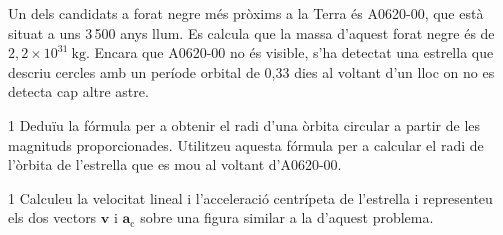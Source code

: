 Un dels candidats a forat negre més pròxims a la Terra és A0620-00, que està situat a uns 3\,500 anys llum. Es calcula que la massa d'aquest forat negre és de $2,2\times 10^{31}\ \mathrm{kg}$. Encara que A0620-00 no és visible, s'ha detectat una estrella que descriu cercles amb un període orbital de 0,33 dies al voltant d'un lloc on no es detecta cap altre astre.


\begin{apartat}{1}
Deduïu la fórmula per a obtenir el radi d'una òrbita circular a partir de les magnituds proporcionades. Utilitzeu aquesta fórmula per a calcular el radi de l'òrbita de l'estrella que es mou al voltant d'A0620-00.
\end{apartat}

\begin{apartat}{1}
Calculeu la velocitat lineal i l'acceleració centrípeta de l'estrella i representeu els dos vectors $\boldsymbol{v}$ i $\boldsymbol{a}_\mathrm{c}$ sobre una figura similar a la d'aquest problema.
\end{apartat}

